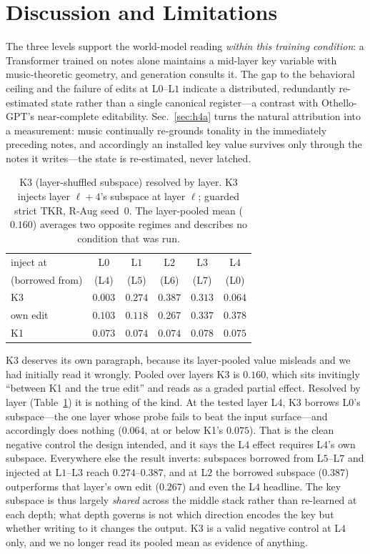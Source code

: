 \documentclass[conference]{IEEEtran}
\newcommand{\tkr}{\mathrm{TKR}}
\begin{document}
\section{Discussion and Limitations}
\label{sec:disc}
The three levels support the world-model reading \emph{within this training
condition}: a Transformer trained on notes alone maintains a mid-layer key variable
with music-theoretic geometry, and generation consults it. The gap to the behavioral
ceiling and the failure of edits at L$0$--L$1$ indicate a distributed, redundantly
re-estimated state rather than a single canonical register---a contrast with
Othello-GPT's near-complete editability. Sec.~\ref{sec:h4a} turns the natural
attribution into a measurement: music continually re-grounds tonality in the
immediately preceding notes, and accordingly an installed key value survives only
through the notes it writes---the state is re-estimated, never latched.

\begin{table}[t]
\centering\caption{K3 (layer-shuffled subspace) resolved by layer. K3 injects layer
$\ell{+}4$'s subspace at layer $\ell$; guarded strict $\tkr$, R-Aug seed~$0$. The
layer-pooled mean ($0.160$) averages two opposite regimes and describes no condition
that was run.}
\label{tab:k3}
\begin{tabular}{lccccc}
\toprule
inject at & L$0$ & L$1$ & L$2$ & L$3$ & L$4$ \\
(borrowed from) & (L$4$) & (L$5$) & (L$6$) & (L$7$) & (L$0$) \\
\midrule
K3            & $0.003$ & $0.274$ & $0.387$ & $0.313$ & $0.064$ \\
own edit      & $0.103$ & $0.118$ & $0.267$ & $0.337$ & $\mathbf{0.378}$ \\
K1            & $0.073$ & $0.074$ & $0.074$ & $0.078$ & $0.075$ \\
\bottomrule
\end{tabular}
\end{table}

K3 deserves its own paragraph, because its layer-pooled value misleads and we had
initially read it wrongly. Pooled over layers K3 is $0.160$, which sits invitingly
``between K1 and the true edit'' and reads as a graded partial effect. Resolved by layer
(Table~\ref{tab:k3}) it is nothing of the kind. At the tested layer L$4$, K3 borrows
L$0$'s subspace---the one layer whose probe fails to beat the input surface---and
accordingly does nothing ($0.064$, at or below K1's $0.075$). That is the clean negative
control the design intended, and it says the L$4$ effect requires L$4$'s own subspace.
Everywhere else the result inverts: subspaces borrowed from L$5$--L$7$ and injected at
L$1$--L$3$ reach $0.274$--$0.387$, and at L$2$ the borrowed subspace ($0.387$)
outperforms that layer's own edit ($0.267$) and even the L$4$ headline. The key subspace
is thus largely \emph{shared} across the middle stack rather than re-learned at each
depth; what depth governs is not which direction encodes the key but whether writing to
it changes the output. K3 is a valid negative control at L$4$ only, and we no longer read
its pooled mean as evidence of anything.
\end{document}
